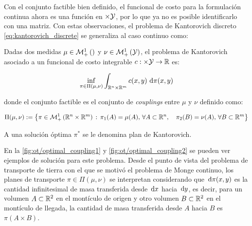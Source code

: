 Con el conjunto factible bien definido, el funcional de costo para la formulación continua ahora es una función en $\times\mathcal{Y}$, por lo que ya no es posible identificarlo con una matriz. Con estas observaciones, el problema de Kantorovich discreto \eqref{eq:kantorovich_discrete} se generaliza al caso continuo como:

\begin{defn}
	Dadas dos medidas $\mu\in\mathcal{M}_+^1\left(\right)$ y $\nu\in\mathcal{M}_+^1\left(\mathcal{Y}\right)$, el problema de Kantorovich asociado a un funcional de costo integrable $c:\times\mathcal{Y}\to\mathbb{R}$ es:

	\begin{equation}
		\label{eq:kantorovich_continuous}
		\inf_{\pi \in \Pi(\mu,\nu)} \int_{\mathbb{R}^n\times\mathbb{R}^m} c(x, y) \,\operatorname{d}\!\pi(x, y)
	\end{equation}

	donde el conjunto factible es el conjunto de \textit{couplings} entre $\mu$ y $\nu$ definido como:

	\begin{equation}
		\label{eq:continuous_coupling}
		\Pi(\mu,\nu) := \left\{\pi\in\mathcal{M}_+^1\left(\mathbb{R}^n\times\mathbb{R}^m\right)\,:\,
		\pi_1(A) = \mu(A),\, \forall A\subset\mathbb{R}^n, \quad
		\pi_2(B) = \nu(A),\, \forall B\subset\mathbb{R}^m\right\}
	\end{equation}

	A una solución óptima $\pi^*$ se le denomina plan de Kantorovich.
\end{defn}

En la \autoref{fig:ot/optimal_coupling1} y \autoref{fig:ot/optimal_coupling2} se pueden ver ejemplos de solución para este problema. Desde el punto de vista del problema de transporte de tierra con el que se motivó el problema de Monge continuo, los planes de transporte $\pi\in\Pi(\mu,\nu)$ se interpretan considerando que $\,\operatorname{d}\!\pi(x,y)$ es la cantidad infinitesimal de masa transferida desde $\,\operatorname{d}\! x$ hacia $\,\operatorname{d}\! y$, es decir, para un volumen $A\subset\mathbb{R}^2$ en el montículo de origen y otro volumen $B\subset\mathbb{R}^2$ en el montículo de llegada, la cantidad de masa transferida desde $A$ hacia $B$ es $\pi(A\times B)$.



